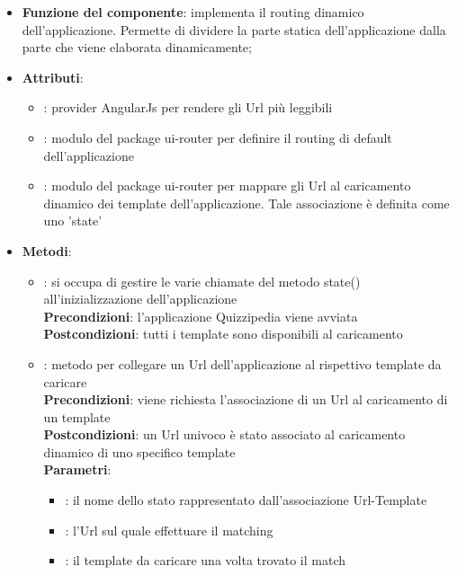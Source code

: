 \begin{itemize}
\item\textbf{Funzione del componente}: implementa il routing dinamico dell'applicazione. Permette di dividere la parte statica dell'applicazione dalla parte che viene elaborata dinamicamente;
\item\textbf{Attributi}:
	\begin{itemize}
		\item{}: provider AngularJs per rendere gli Url più leggibili\\
		\item{}: modulo del package ui-router per definire il routing di default dell'applicazione\\
		\item{}: modulo del package ui-router per mappare gli Url al caricamento dinamico dei template dell'applicazione. Tale associazione è definita come uno 'state'\\
	\end{itemize}
\item\textbf{Metodi}:
	\begin{itemize}
		\item{}: si occupa di gestire le varie chiamate del metodo state() all'inizializzazione dell'applicazione\\
		\textbf{Precondizioni}: l'applicazione Quizzipedia viene avviata\\
		\textbf{Postcondizioni}: tutti i template sono disponibili al caricamento\\
		\item{}: metodo per collegare un Url dell'applicazione al rispettivo template da caricare\\
		\textbf{Precondizioni}: viene richiesta l'associazione di un Url al caricamento di un template\\
		\textbf{Postcondizioni}: un Url univoco è stato associato al caricamento dinamico di uno specifico template\\
		\textbf{Parametri}:
			\begin{itemize}
				\item{}: il nome dello stato rappresentato dall'associazione Url-Template\\
				\item{}: l'Url sul quale effettuare il matching\\
				\item{}: il template da caricare una volta trovato il match\\
			\end{itemize}
	\end{itemize}
\end{itemize}
\newpage

